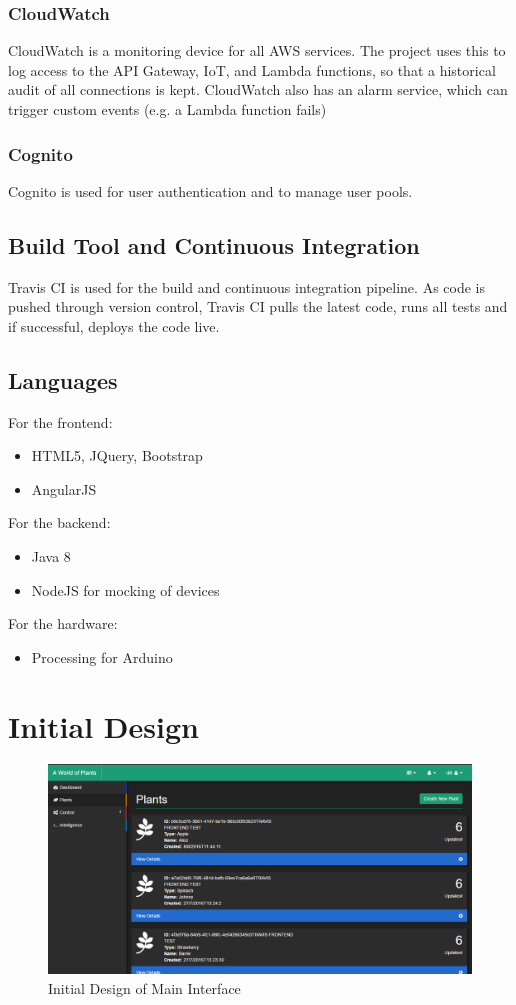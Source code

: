 \documentclass{article}
\begin{document}
	\subsubsection{CloudWatch}
	CloudWatch is a monitoring device for all AWS services. The project uses this to log access to the API Gateway, IoT, and Lambda functions, so that a historical audit of all connections is kept. CloudWatch also has an alarm service, which can trigger custom events (e.g. a Lambda function fails)
	\subsubsection{Cognito}
	Cognito is used for user authentication and to manage user pools.
	
	\subsection{Build Tool and Continuous Integration}
	Travis CI is used for the build and continuous integration pipeline. As code is pushed through version control, Travis CI pulls the latest code, runs all tests and if successful, deploys the code live.

	\subsection{Languages}
	For the frontend:
	\begin{itemize}
		\item HTML5, JQuery, Bootstrap
		\item AngularJS
	\end{itemize}
	
	For the backend:
	\begin{itemize}
		\item Java 8
		\item NodeJS for mocking of devices
	\end{itemize}
	
	For the hardware:
	\begin{itemize}
		\item Processing for Arduino
	\end{itemize}
\section{Initial Design}
\begin{figure}[H]
 	\includegraphics[width=\textwidth]{images/initial-design.PNG}
  	\caption{Initial Design of Main Interface}
\end{figure}
\end{document}
